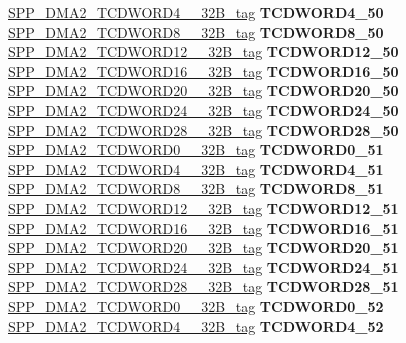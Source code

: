 \begin{DoxyCompactItemize}
\begin{tabbing}
\>\>\mbox{\hyperlink{unionSPP__DMA2__TCDWORD4____32B__tag}{SPP\_DMA2\_TCDWORD4\_\_32B\_tag}} {\bfseries TCDWORD4\_50}\\
\>\>\mbox{\hyperlink{unionSPP__DMA2__TCDWORD8____32B__tag}{SPP\_DMA2\_TCDWORD8\_\_32B\_tag}} {\bfseries TCDWORD8\_50}\\
\>\>\mbox{\hyperlink{unionSPP__DMA2__TCDWORD12____32B__tag}{SPP\_DMA2\_TCDWORD12\_\_32B\_tag}} {\bfseries TCDWORD12\_50}\\
\>\>\mbox{\hyperlink{unionSPP__DMA2__TCDWORD16____32B__tag}{SPP\_DMA2\_TCDWORD16\_\_32B\_tag}} {\bfseries TCDWORD16\_50}\\
\>\>\mbox{\hyperlink{unionSPP__DMA2__TCDWORD20____32B__tag}{SPP\_DMA2\_TCDWORD20\_\_32B\_tag}} {\bfseries TCDWORD20\_50}\\
\>\>\mbox{\hyperlink{unionSPP__DMA2__TCDWORD24____32B__tag}{SPP\_DMA2\_TCDWORD24\_\_32B\_tag}} {\bfseries TCDWORD24\_50}\\
\>\>\mbox{\hyperlink{unionSPP__DMA2__TCDWORD28____32B__tag}{SPP\_DMA2\_TCDWORD28\_\_32B\_tag}} {\bfseries TCDWORD28\_50}\\
\>\>\mbox{\hyperlink{unionSPP__DMA2__TCDWORD0____32B__tag}{SPP\_DMA2\_TCDWORD0\_\_32B\_tag}} {\bfseries TCDWORD0\_51}\\
\>\>\mbox{\hyperlink{unionSPP__DMA2__TCDWORD4____32B__tag}{SPP\_DMA2\_TCDWORD4\_\_32B\_tag}} {\bfseries TCDWORD4\_51}\\
\>\>\mbox{\hyperlink{unionSPP__DMA2__TCDWORD8____32B__tag}{SPP\_DMA2\_TCDWORD8\_\_32B\_tag}} {\bfseries TCDWORD8\_51}\\
\>\>\mbox{\hyperlink{unionSPP__DMA2__TCDWORD12____32B__tag}{SPP\_DMA2\_TCDWORD12\_\_32B\_tag}} {\bfseries TCDWORD12\_51}\\
\>\>\mbox{\hyperlink{unionSPP__DMA2__TCDWORD16____32B__tag}{SPP\_DMA2\_TCDWORD16\_\_32B\_tag}} {\bfseries TCDWORD16\_51}\\
\>\>\mbox{\hyperlink{unionSPP__DMA2__TCDWORD20____32B__tag}{SPP\_DMA2\_TCDWORD20\_\_32B\_tag}} {\bfseries TCDWORD20\_51}\\
\>\>\mbox{\hyperlink{unionSPP__DMA2__TCDWORD24____32B__tag}{SPP\_DMA2\_TCDWORD24\_\_32B\_tag}} {\bfseries TCDWORD24\_51}\\
\>\>\mbox{\hyperlink{unionSPP__DMA2__TCDWORD28____32B__tag}{SPP\_DMA2\_TCDWORD28\_\_32B\_tag}} {\bfseries TCDWORD28\_51}\\
\>\>\mbox{\hyperlink{unionSPP__DMA2__TCDWORD0____32B__tag}{SPP\_DMA2\_TCDWORD0\_\_32B\_tag}} {\bfseries TCDWORD0\_52}\\
\>\>\mbox{\hyperlink{unionSPP__DMA2__TCDWORD4____32B__tag}{SPP\_DMA2\_TCDWORD4\_\_32B\_tag}} {\bfseries TCDWORD4\_52}\\

\end{tabbing}
\end{DoxyCompactItemize}
